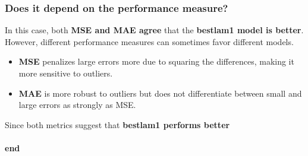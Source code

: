 \documentclass[
]{article}
\begin{document}
\hypertarget{does-it-depend-on-the-performance-measure}{%
\subsubsection{Does it depend on the performance
measure?}\label{does-it-depend-on-the-performance-measure}}

In this case, both \textbf{MSE and MAE agree} that the \textbf{bestlam1
model is better}. However, different performance measures can sometimes
favor different models.

\begin{itemize}
\item
  \textbf{MSE} penalizes large errors more due to squaring the
  differences, making it more sensitive to outliers.
\item
  \textbf{MAE} is more robust to outliers but does not differentiate
  between small and large errors as strongly as MSE.
\end{itemize}

Since both metrics suggest that \textbf{bestlam1 performs better}

\hypertarget{end-1}{%
\paragraph{end}\label{end-1}}
\end{document}

